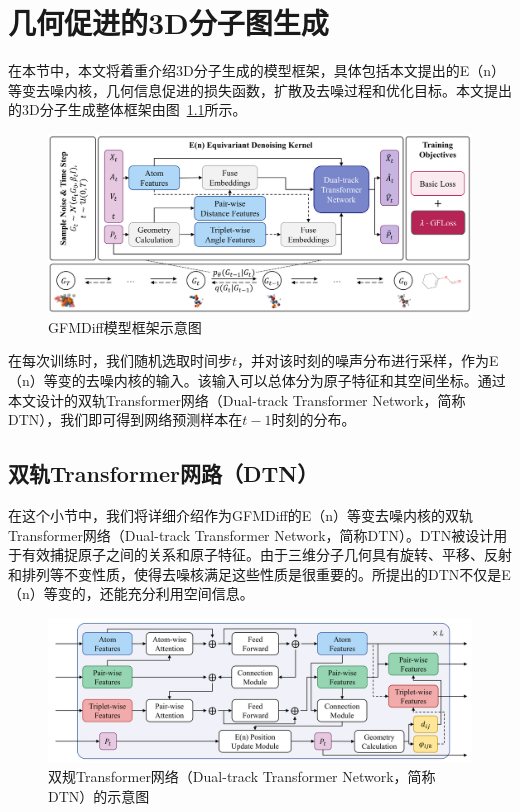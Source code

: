 \chapter[几何促进的3D分子图生成]{几何促进的3D分子图生成}
\label{chap:gfmdiff}

在本节中，本文将着重介绍3D分子生成的模型框架，具体包括本文提出的E（n）等变去噪内核，几何信息促进的损失函数，扩散及去噪过程和优化目标。本文提出的3D分子生成整体框架由图~\ref{fig:gfmdiff}所示。

\begin{figure}[h]
    \centering
    \includegraphics[width=\linewidth]{figures/overview_gfmdiff.png}
    \caption{GFMDiff模型框架示意图}
    \label{fig:gfmdiff}
  \end{figure}

在每次训练时，我们随机选取时间步$t$，并对该时刻的噪声分布进行采样，作为E（n）等变的去噪内核的输入。该输入可以总体分为原子特征和其空间坐标。通过本文设计的双轨Transformer网络（Dual-track Transformer Network，简称DTN），我们即可得到网络预测样本在$t-1$时刻的分布。

\section{双轨Transformer网路（DTN）}

在这个小节中，我们将详细介绍作为GFMDiff的E（n）等变去噪内核的双轨Transformer网络（Dual-track Transformer Network，简称DTN）。DTN被设计用于有效捕捉原子之间的关系和原子特征。由于三维分子几何具有旋转、平移、反射和排列等不变性质，使得去噪核满足这些性质是很重要的。所提出的DTN不仅是E（n）等变的，还能充分利用空间信息。

\begin{figure}[h]
  \centering
  \includegraphics[width=\linewidth]{figures/structure_dtn.png}
  \caption{双规Transformer网络（Dual-track Transformer Network，简称DTN）的示意图}
  \label{fig:dtn}
\end{figure}

